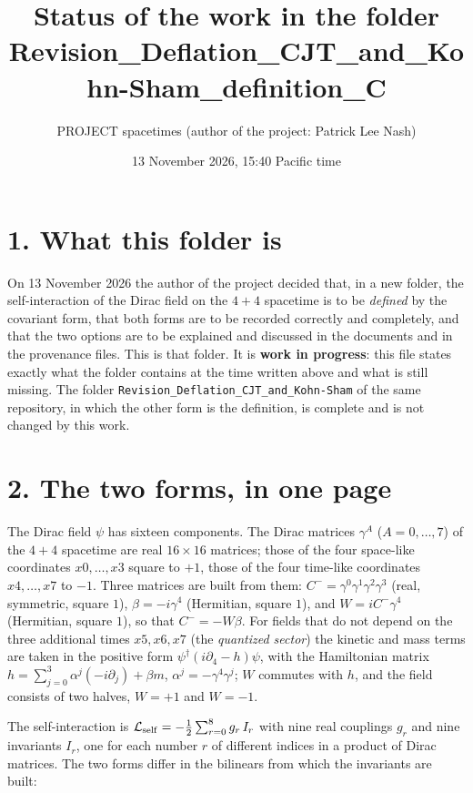 \documentclass[
  11pt,
]{article}
\title{Status of the work in the folder
Revision\_Deflation\_CJT\_and\_Kohn-Sham\_definition\_C}
\author{PROJECT spacetimes (author of the project: Patrick Lee Nash)}
\date{13 November 2026, 15:40 Pacific time}
\begin{document}
\maketitle

\hypertarget{what-this-folder-is}{%
\section{1. What this folder is}\label{what-this-folder-is}}

On 13 November 2026 the author of the project decided that, in a new
folder, the self-interaction of the Dirac field on the \(4+4\) spacetime
is to be \emph{defined} by the covariant form, that both forms are to be
recorded correctly and completely, and that the two options are to be
explained and discussed in the documents and in the provenance files.
This is that folder. It is \textbf{work in progress}: this file states
exactly what the folder contains at the time written above and what is
still missing. The folder
\texttt{Revision\_Deflation\_CJT\_and\_Kohn-Sham} of the same
repository, in which the other form is the definition, is complete and
is not changed by this work.

\hypertarget{the-two-forms-in-one-page}{%
\section{2. The two forms, in one
page}\label{the-two-forms-in-one-page}}

The Dirac field \(\psi\) has sixteen components. The Dirac matrices
\(\gamma^A\) (\(A=0,\dots,7\)) of the \(4+4\) spacetime are real
\(16\times16\) matrices; those of the four space-like coordinates
\(x0,\dots,x3\) square to \(+1\), those of the four time-like
coordinates \(x4,\dots,x7\) to \(-1\). Three matrices are built from
them: \(C^-=\gamma^0\gamma^1\gamma^2\gamma^3\) (real, symmetric, square
\(1\)), \(\beta=-i\gamma^4\) (Hermitian, square \(1\)), and
\(W=iC^-\gamma^4\) (Hermitian, square \(1\)), so that \(C^-=-W\beta\).
For fields that do not depend on the three additional times \(x5,x6,x7\)
(the \emph{quantized sector}) the kinetic and mass terms are taken in
the positive form \(\psi^\dagger(i\partial_4-h)\psi\), with the
Hamiltonian matrix \(h=\sum_{j=0}^{3}\alpha^j(-i\partial_j)+\beta m\),
\(\alpha^j=-\gamma^4\gamma^j\); \(W\) commutes with \(h\), and the field
consists of two halves, \(W=+1\) and \(W=-1\).

The self-interaction is
\(\mathcal L_{\rm self}=-\tfrac12\sum_{r=0}^{8}g_r\,I_r\) with nine real
couplings \(g_r\) and nine invariants \(I_r\), one for each number \(r\)
of different indices in a product of Dirac matrices. The two forms
differ in the bilinears from which the invariants are built:
\end{document}
